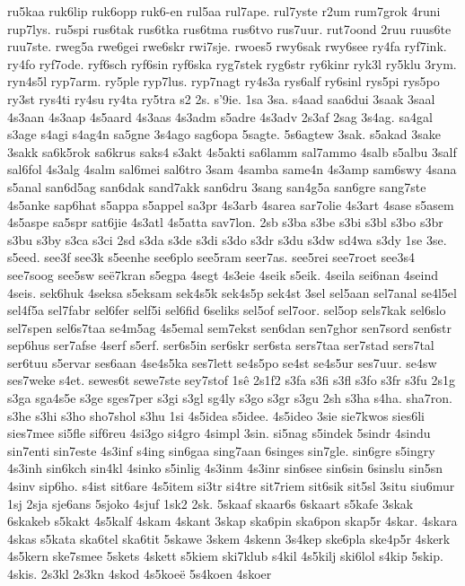 {ru5kaa
ruk6lip
ruk6opp
ruk6-en
rul5aa
rul7ape.
rul7yste
r2um
rum7grok
4runi
rup7lys.
ru5spi
rus6tak
rus6tka
rus6tma
rus6tvo
rus7uur.
rut7oond
2ruu
ruus6te
ruu7ste.
rweg5a
rwe6gei
rwe6skr
rwi7sje.
rwoes5
rwy6sak
rwy6see
ry4fa
ryf7ink.
ry4fo
ryf7ode.
ryf6sch
ryf6sin
ryf6ska
ryg7stek
ryg6str
ry6kinr
ryk3l
ry5klu
3rym.
ryn4s5l
ryp7arm.
ry5ple
ryp7lus.
ryp7nagt
ry4s3a
rys6alf
ry6sinl
rys5pi
rys5po
ry3st
rys4ti
ry4su
ry4ta
ry5tra
s2
2s.
s'9ie.
1sa
3sa.
s4aad
saa6dui
3saak
3saal
4s3aan
4s3aap
4s5aard
4s3aas
4s3adm
s5adre
4s3adv
2s3af
2sag
3s4ag.
sa4gal
s3age
s4agi
s4ag4n
sa5gne
3s4ago
sag6opa
5sagte.
5s6agtew
3sak.
s5akad
3sake
3sakk
sa6k5rok
sa6krus
saks4
s3akt
4s5akti
sa6lamm
sal7ammo
4salb
s5albu
3salf
sal6fol
4s3alg
4salm
sal6mei
sal6tro
3sam
4samba
same4n
4s3amp
sam6swy
4sana
s5anal
san6d5ag
san6dak
sand7akk
san6dru
3sang
san4g5a
san6gre
sang7ste
4s5anke
sap6hat
s5appa
s5appel
sa3pr
4s3arb
4sarea
sar7olie
4s3art
4sase
s5asem
4s5aspe
sa5spr
sat6jie
4s3atl
4s5atta
sav7lon.
2sb
s3ba
s3be
s3bi
s3bl
s3bo
s3br
s3bu
s3by
s3ca
s3ci
2sd
s3da
s3de
s3di
s3do
s3dr
s3du
s3dw
sd4wa
s3dy
1se
3se.
s5eed.
see3f
see3k
s5eenhe
see6plo
see5ram
seer7as.
see5rei
see7roet
see3s4
see7soog
see5sw
seë7kran
s5egpa
4segt
4s3eie
4seik
s5eik.
4seila
sei6nan
4seind
4seis.
sek6huk
4seksa
s5eksam
sek4s5k
sek4s5p
sek4st
3sel
sel5aan
sel7anal
se4l5el
sel4f5a
sel7fabr
sel6fer
self5i
sel6fid
6seliks
sel5of
sel7oor.
sel5op
sels7kak
sel6slo
sel7spen
sel6s7taa
se4m5ag
4s5emal
sem7ekst
sen6dan
sen7ghor
sen7sord
sen6str
sep6hus
ser7afse
4serf
s5erf.
ser6s5in
ser6skr
ser6sta
sers7taa
ser7stad
sers7tal
ser6tuu
s5ervar
ses6aan
4se4s5ka
ses7lett
se4s5po
se4st
se4s5ur
ses7uur.
se4sw
ses7weke
s4et.
sewes6t
sewe7ste
sey7stof
1sê
2s1f2
s3fa
s3fi
s3fl
s3fo
s3fr
s3fu
2s1g
s3ga
sga4s5e
s3ge
sges7per
s3gi
s3gl
sg4ly
s3go
s3gr
s3gu
2sh
s3ha
s4ha.
sha7ron.
s3he
s3hi
s3ho
sho7shol
s3hu
1si
4s5idea
s5idee.
4s5ideo
3sie
sie7kwos
sies6li
sies7mee
si5fle
sif6reu
4si3go
si4gro
4simpl
3sin.
si5nag
s5indek
5sindr
4sindu
sin7enti
sin7este
4s3inf
s4ing
sin6gaa
sing7aan
6singes
sin7gle.
sin6gre
s5ingry
4s3inh
sin6kch
sin4kl
4sinko
s5inlig
4s3inm
4s3inr
sin6see
sin6sin
6sinslu
sin5sn
4sinv
sip6ho.
s4ist
sit6are
4s5item
si3tr
si4tre
sit7riem
sit6sik
sit5sl
3situ
siu6mur
1sj
2sja
sje6ans
5sjoko
4sjuf
1sk2
2sk.
5skaaf
skaar6s
6skaart
s5kafe
3skak
6skakeb
s5kakt
4s5kalf
4skam
4skant
3skap
ska6pin
ska6pon
skap5r
4skar.
4skara
4skas
s5kata
ska6tel
ska6tit
5skawe
3skem
4skenn
3s4kep
ske6pla
ske4p5r
4skerk
4s5kern
ske7smee
5skets
4skett
s5kiem
ski7klub
s4kil
4s5kilj
ski6lol
s4kip
5skip.
4skis.
2s3kl
2s3kn
4skod
4s5koeë
5s4koen
4skoer
}
